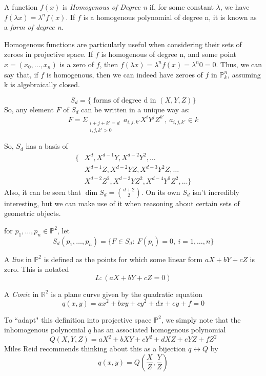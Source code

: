 \begin{mydef}
A function $f(x)$ is \emph{Homogenous of Degree n} if, for some 
constant $\lambda$, we have $f(\lambda x) = \lambda ^n f(x)$.
If $f$ is a homogenous polynomial of degree n, it is known as a \emph{form of degree n}.
\end{mydef}

Homogenous functions are particularly useful when considering their
sets of zeroes in projective space. If $f$ is homogenous of degree
n, and some point $x = (x_0, ..., x_n)$ is a zero of $f$, then
$f(\lambda x) = \lambda^n f(x) = \lambda^n 0 = 0$. Thus, we can say
that, if $f$ is homogenous, then we can indeed have zeroes of $f$ in $\mathbb{P}^n_k$,
assuming k is algebraically closed.

\begin{mydef}
\[
S_d = \{\text{ forms of degree d in $(X, Y, Z)$}\}
\]
So, any element $F$ of $S_d$ can be written in a unique way as:
\[
F = \Sigma _{\substack{i+j+k'=d \\ i,j,k' > 0}}~a_{i,j,k'} X^i Y^j Z^{k'},~a_{i,j,k'} \in k
\]
\end{mydef}
So, $S_d$ has a basis of 
\begin{align*}
\{&X^d, X^{d-1}Y, X^{d-2}Y^2, \dots\\
&X^{d-1}Z, X^{d-2}YZ, X^{d-3}Y^2Z, \dots\\
&X^{d-2}Z^2, X^{d-3}YZ^2, X^{d-4}Y^2Z^2, \dots\}
\end{align*}
Also, it can be seen that $\dim S_d = {d+2 \choose 2}$. On its own
$S_d$ isn't incredibly interesting, but we can make use of it when
reasoning about certain sets of geometric objects.

\begin{mydef}
for $p_1, \dots, p_n \in \mathbb{P}^2$, let
\[
	S_d(p_1, \dots, p_n) = \{ F \in S_d :~F(p_i) = 0,~i=1,\dots,n\}
\]
\end{mydef}

\begin{mydef}
A \emph{line} in $\mathbb{P}^2$ is defined as the points for which
some linear form $aX + bY + cZ$ is zero. This is notated
\[
L:(aX+bY+cZ=0)
\]
\end{mydef}

\begin{mydef}
A \emph{Conic} in $\mathbb{R}^2$ is a plane curve given by the quadratic
equation
\[
q(x,y) = ax^2 + bxy + cy^2 + dx + ey + f = 0
\]
\end{mydef}

To ``adapt" this definition into projective space $\mathbb{P}^2$, we simply
note that the inhomogenous polynomial $q$ has an associated
homogenous polynomial 
\[
Q(X,Y,Z) = aX^2 + bXY + cY^2 + dXZ + eYZ + fZ^2
\]
Miles Reid recommends thinking about this as a bijection $q \leftrightarrow Q$ by
\[
q(x,y) = Q(\frac{X}{Z},\frac{Y}{Z})
\]

